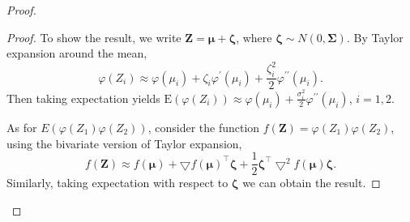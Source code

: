 \begin{proof}
\begin{proof}
To show the result, we write $\mathbf{Z}=\boldsymbol{\mu}+\boldsymbol{\zeta}$, where $\boldsymbol{\zeta}\sim N(0,\boldsymbol{\Sigma})$.
By Taylor expansion around the mean, 
\begin{equation*}
    \varphi(Z_i)\approx \varphi(\mu_i)+\zeta_i\varphi^{\prime}(\mu_i)+\frac{\zeta_i^2}{2}\varphi^{\prime\prime}(\mu_i).
\label{eq:taylorlogitnomralmean}
\end{equation*}
Then taking expectation yields $\text{E}(\varphi(Z_i))\approx \varphi(\mu_i)+\frac{\sigma_i^2}{2}\varphi^{\prime\prime}(\mu_i)$, $i=1,2$.


As for $E(\varphi(Z_1)\varphi(Z_2))$, consider the function $f(\mathbf{Z})=\varphi(Z_1)\varphi(Z_2)$, using the bivariate version of Taylor expansion,
\begin{equation*}
f(\mathbf{Z})\approx f(\boldsymbol{\mu})+\bigtriangledown f(\boldsymbol{\mu})^{\top}\boldsymbol{\zeta}+\frac{1}{2}\boldsymbol{\zeta}^{\top}\bigtriangledown^2f(\boldsymbol{\mu})\boldsymbol{\zeta}.
\label{eq:taylorlogitnormalcov}    
\end{equation*}
Similarly, taking expectation with respect to $\boldsymbol{\zeta}$ we can obtain the result. 
\end{proof}


\end{proof}
